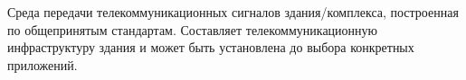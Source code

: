Среда передачи телекоммуникационных сигналов
здания/комплекса, построенная по общепринятым стандартам.
Составляет телекоммуникационную инфраструктуру здания и может 
быть установлена до выбора конкретных приложений.
